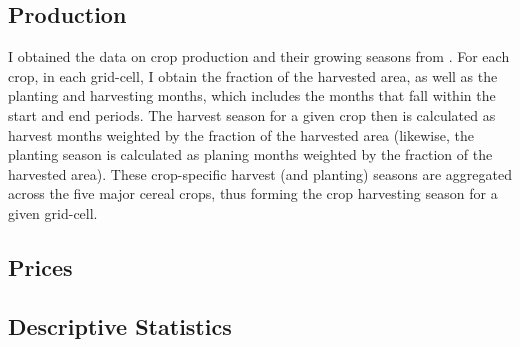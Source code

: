 \documentclass[11pt]{article}
\begin{document}
\subsection{Production}

I obtained the data on crop production and their growing seasons from \cite{sacks2010}. For each crop, in each grid-cell, I obtain the fraction of the harvested area, as well as the planting and harvesting months, which includes the months that fall within the start and end periods. The harvest season for a given crop then is calculated as harvest months weighted by the fraction of the harvested area (likewise, the planting season is calculated as planing months weighted by the fraction of the harvested area). These crop-specific harvest (and planting) seasons are aggregated across the five major cereal crops, thus forming the crop harvesting season for a given grid-cell.

%



\subsection{Prices}







\subsection{Descriptive Statistics} 
\end{document}
